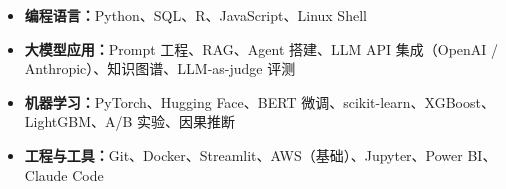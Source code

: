 \begin{itemize}
  \item \textbf{编程语言：}Python、SQL、R、JavaScript、Linux Shell
  \item \textbf{大模型应用：}Prompt 工程、RAG、Agent 搭建、LLM API 集成（OpenAI / Anthropic）、知识图谱、LLM-as-judge 评测
  \item \textbf{机器学习：}PyTorch、Hugging Face、BERT 微调、scikit-learn、XGBoost、LightGBM、A/B 实验、因果推断
  \item \textbf{工程与工具：}Git、Docker、Streamlit、AWS（基础）、Jupyter、Power BI、Claude Code
\end{itemize}

